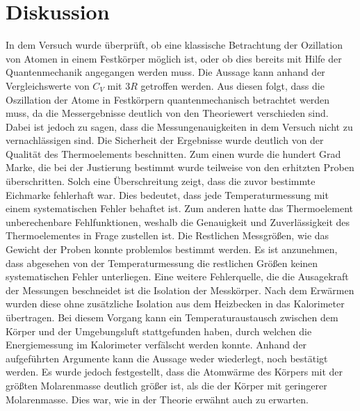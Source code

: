 \section{Diskussion}

In dem Versuch wurde überprüft, ob eine klassische Betrachtung der Ozillation
von Atomen in einem Festkörper möglich ist, oder ob dies bereits mit Hilfe
der Quantenmechanik angegangen werden muss. Die Aussage kann anhand der
Vergleichswerte von $C_V$ mit $3R$ getroffen werden. Aus diesen folgt, dass
die Oszillation der Atome in Festkörpern quantenmechanisch betrachtet werden
muss, da die Messergebnisse deutlich von den Theoriewert verschieden sind.
Dabei ist jedoch zu sagen, dass die Messungenauigkeiten in dem Versuch nicht
zu vernachlässigen sind. Die Sicherheit der Ergebnisse  wurde deutlich von der
Qualität des Thermoelements beschnitten. Zum einen wurde die hundert Grad Marke,
die bei der Justierung bestimmt wurde teilweise von den erhitzten Proben
überschritten. Solch eine Überschreitung zeigt, dass die zuvor bestimmte
Eichmarke fehlerhaft war. Dies bedeutet, dass jede Temperaturmessung mit einem
systematischen Fehler behaftet ist. Zum anderen hatte das Thermoelement
unberechenbare Fehlfunktionen, weshalb die Genauigkeit und Zuverlässigkeit des
Thermoelementes in Frage zustellen ist. Die Restlichen Messgrößen, wie das
Gewicht der Proben konnte problemlos bestimmt werden. Es ist anzunehmen, dass
abgesehen von der Temperaturmessung die restlichen Größen keinen systematischen
Fehler unterliegen. Eine weitere Fehlerquelle, die die Ausagekraft der Messungen
beschneidet ist die Isolation der Messkörper. Nach dem Erwärmen wurden diese
ohne zusätzliche Isolation aus dem Heizbecken in das Kalorimeter übertragen.
Bei diesem Vorgang kann ein Temperaturaustausch zwischen dem Körper und der
Umgebungsluft stattgefunden haben, durch welchen die Energiemessung im Kalorimeter
verfälscht werden konnte.
Anhand der aufgeführten Argumente kann die Aussage weder wiederlegt, noch bestätigt werden.
Es wurde jedoch festgestellt, dass die Atomwärme des Körpers mit der größten
Molarenmasse deutlich größer ist, als die der Körper mit geringerer Molarenmasse.
Dies war, wie in der Theorie erwähnt auch zu erwarten.

\printbibliography


